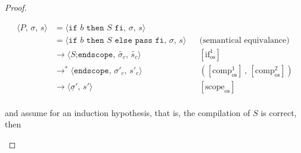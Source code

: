 \documentclass{article}
\begin{document}
\begin{proof}
\begin{itemize}
\begin{itemize}
                \[
                  \begin{aligned}
                  \langle P,\, \sigma,\, s \rangle
                  &=\langle \texttt{if } b \texttt{ then } S \texttt{ fi},\, \sigma,\, s \rangle \\
                  &=\langle \texttt{if } b \texttt{ then } S \texttt{ else pass fi},\, \sigma,\, s \rangle 
                  && \text{(semantical equivalance)}\\
                  &\rightarrow \langle S\texttt{;endscope},\, \tilde{\sigma_c} ,\, \tilde{s_c} \rangle
                  && [\text{if}^1_{\text{os}}]   \\
                  &\rightarrow^\ast \langle \texttt{endscope},\, \sigma'_c ,\, s'_c \rangle 
                  && ([\text{comp}^1_{\text{os}}] \,,\, [\text{comp}^2_{\text{os}}])   \\
                  &\rightarrow \langle \underline{\sigma}' ,\, s' \rangle
                  && [\text{scope}_{\text{os}}]   \\
                  \end{aligned}
              \]

            and assume for an induction hypothesis, that is, the compilation of $S$ is correct, then


\end{itemize}
\end{itemize}
\end{proof}
\end{document}
